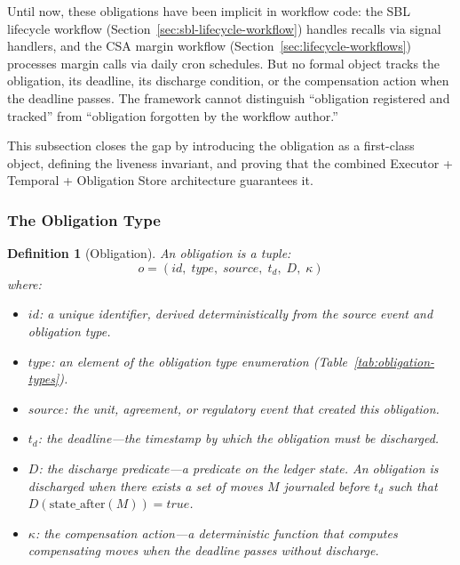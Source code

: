\documentclass[11pt,a4paper]{article}
\newtheorem{definition}{Definition}[section]
\begin{document}
Until now, these obligations have been implicit in workflow code: the SBL lifecycle workflow (Section~\ref{sec:sbl-lifecycle-workflow}) handles recalls via signal handlers, and the CSA margin workflow (Section~\ref{sec:lifecycle-workflows}) processes margin calls via daily cron schedules. But no formal object tracks the obligation, its deadline, its discharge condition, or the compensation action when the deadline passes. The framework cannot distinguish ``obligation registered and tracked'' from ``obligation forgotten by the workflow author.''

This subsection closes the gap by introducing the obligation as a first-class object, defining the liveness invariant, and proving that the combined Executor + Temporal + Obligation Store architecture guarantees it.

\subsubsection{The Obligation Type}
\label{sec:obligation-type}

\begin{definition}[Obligation]
\label{def:obligation}
An \emph{obligation} is a tuple:
\[
o = (\mathit{id},\; \mathit{type},\; \mathit{source},\; t_d,\; D,\; \kappa)
\]
where:
\begin{itemize}[nosep]
\item $\mathit{id}$: a unique identifier, derived deterministically from the source event and obligation type.
\item $\mathit{type}$: an element of the obligation type enumeration (Table~\ref{tab:obligation-types}).
\item $\mathit{source}$: the unit, agreement, or regulatory event that created this obligation.
\item $t_d$: the \emph{deadline}---the timestamp by which the obligation must be discharged.
\item $D$: the \emph{discharge predicate}---a predicate on the ledger state. An obligation is discharged when there exists a set of moves $M$ journaled before $t_d$ such that $D(\mathrm{state\_after}(M)) = \mathit{true}$.
\item $\kappa$: the \emph{compensation action}---a deterministic function that computes compensating moves when the deadline passes without discharge.
\end{itemize}
\end{definition}
\end{document}
